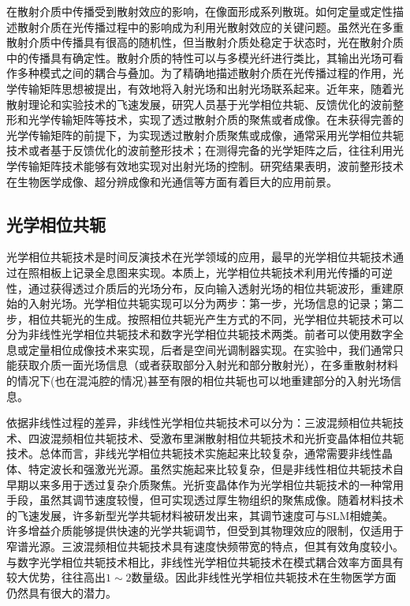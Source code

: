 在散射介质中传播受到散射效应的影响，在像面形成系列散斑。如何定量或定性描述散射介质在光传播过程中的影响成为利用光散射效应的关键问题。虽然光在多重散射介质中传播具有很高的随机性，但当散射介质处稳定于状态时，光在散射介质中的传播具有确定性。散射介质的特性可以与多模光纤进行类比，其输出光场可看作多种模式之间的耦合与叠加。为了精确地描述散射介质在光传播过程的作用，光学传输矩阵思想被提出，有效地将入射光场和出射光场联系起来。近年来，随着光散射理论和实验技术的飞速发展，研究人员基于光学相位共轭、反馈优化的波前整形和光学传输矩阵等技术，实现了透过散射介质的聚焦或者成像\cite{yaqoob_optical_2008,Vellekoop2007,vellekoop_exploiting_2010,conkey_genetic_2012,blochet_fast_2017,Popoff2010}。在未获得完善的光学传输矩阵的前提下，为实现透过散射介质聚焦或成像，通常采用光学相位共轭技术或者基于反馈优化的波前整形技术；在测得完备的光学矩阵之后，往往利用光学传输矩阵技术能够有效地实现对出射光场的控制。研究结果表明，波前整形技术在生物医学成像、超分辨成像和光通信等方面有着巨大的应用前景。

\subsection{光学相位共轭}

光学相位共轭技术是时间反演技术在光学领域的应用，最早的光学相位共轭技术通过在照相板上记录全息图来实现\cite{derode_robust_1995,draeger_one_channel_1997,leith_holographic_1966,fink_acoustic_2001}。本质上，光学相位共轭技术利用光传播的可逆性，通过获得透过介质后的光场分布，反向输入透射光场的相位共轭波形，重建原始的入射光场。光学相位共轭实现可以分为两步：第一步，光场信息的记录；第二步，相位共轭光的生成。按照相位共轭光产生方式的不同，光学相位共轭技术可以分为非线性光学相位共轭技术和数字光学相位共轭技术两类\cite{fisher_optical_2012}。前者可以使用数字全息或定量相位成像技术来实现，后者是空间光调制器实现。在实验中，我们通常只能获取介质一面光场信息（或者获取部分入射光和部分散射光），在多重散射材料的情况下(也在混沌腔的情况)甚至有限的相位共轭也可以地重建部分的入射光场信息。

依据非线性过程的差异，非线性光学相位共轭技术可以分为：三波混频相位共轭技术\cite{voronin_compensation_1979}、四波混频相位共轭技术\cite{bloom_conjugate_1977,yariv_amplified_1977}、受激布里渊散射相位共轭技术\cite{kralikova_image_1997}和光折变晶体相位共轭技术\cite{karaguleff_optical_1990}。总体而言，非线光学相位共轭技术实施起来比较复杂，通常需要非线性晶体、特定波长和强激光光源。虽然实施起来比较复杂，但是非线性相位共轭技术自早期以来多用于透过复杂介质聚焦。光折变晶体作为光学相位共轭技术的一种常用手段，虽然其调节速度较慢，但可实现透过厚生物组织的聚焦成像。随着材料技术的飞速发展，许多新型光学共轭材料被研发出来，其调节速度可与SLM相媲美。许多增益介质能够提供快速的光学共轭调节，但受到其物理效应的限制，仅适用于窄谱光源。三波混频相位共轭技术具有速度快频带宽的特点，但其有效角度较小。与数字光学相位共轭技术相比，非线性光学相位共轭技术在模式耦合效率方面具有较大优势\cite{fink_acoustic_2001}，往往高出$1 \sim 2$数量级。因此非线性光学相位共轭技术在生物医学方面仍然具有很大的潜力。

